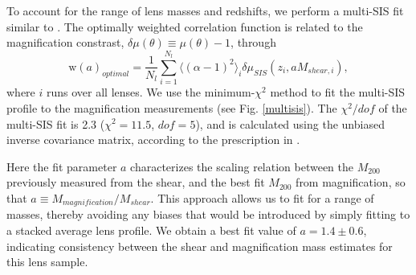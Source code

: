 To account for the range of lens masses and redshifts, we perform a multi-SIS fit similar to \citet{Hildebrandt11}.  The optimally weighted correlation function is related to the magnification constrast, $\delta\mu(\theta) \equiv \mu(\theta) -1$, through
\begin{equation}
\mathrm{w}(a)_{optimal}= \frac{1}{N_{l}}\sum_{i=1}^{N_{l}} \langle (\alpha -1)^2 \rangle_i \delta \mu_{SIS} (z_i, aM_{shear,i}),
\end{equation}
where $i$ runs over all lenses. We use the minimum-$\chi^2$ method to fit the multi-SIS profile to the magnification measurements (see Fig. \ref{multisis}). The $\chi^2/dof$ of the multi-SIS fit is 2.3 ($\chi^2=11.5$, $dof=5$), and is calculated using the unbiased inverse covariance matrix, according to the prescription in \citet{Hartlap07}.

Here the fit parameter $a$ characterizes the scaling relation between the $M_{200}$ previously measured from the shear, and the best fit $M_{200}$ from magnification, so that $a \equiv M_{magnification}/M_{shear}$. This approach allows us to fit for a range of masses, thereby avoiding any biases that would be introduced by simply fitting to a stacked average lens profile.  We obtain a best fit value of $a=1.4 \pm 0.6$, indicating consistency between the shear and magnification mass estimates for this lens sample.


